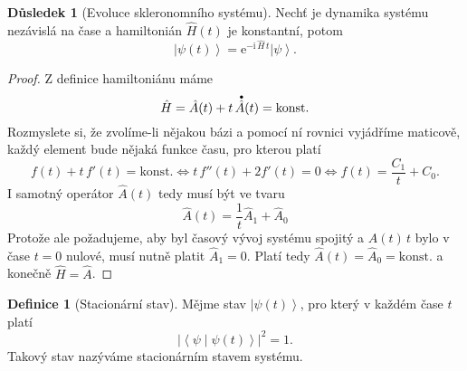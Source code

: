 \documentclass[10pt,a4paper]{article}
\theoremstyle{definition}
\newtheorem{definition}[theorem]{Definice}
\newtheorem{corollary}[theorem]{Důsledek}
\newcommand{\const}[1]{\mathrm{#1}}
\newcommand{\abs}[1]{\left| #1 \right|}
\newcommand{\ket}[1]{\left| #1 \right>}
\newcommand{\braket}[2]{\left< #1 \middle| #2 \right>}
\newcommand{\e}[1]{\const{e}^{#1}}
\renewcommand{\i}{\const{i}}
\newcommand{\bigdot}[1]{\accentset{\bullet}{#1}}
\def\konst{\mathrm{konst.}}
\begin{document}
\begin{corollary}[Evoluce skleronomního systému]
    \label{evoluce-skleronomniho-systemu}
    Nechť je dynamika systému nezávislá na čase a hamiltonián $\hat H(t)$ je konstantní, potom
    \begin{equation*}
        \ket{\psi(t)} = \e{-\i \, \hat{H} \, t} \ket{\psi}.
    \end{equation*}
\end{corollary}
\begin{proof}
    Z definice hamiltoniánu máme
    \begin{equation*}
        \hat H = \hat A(t) + t \, \bigdot{\hat A}(t) = \konst
    \end{equation*}
    Rozmyslete si, že zvolíme-li nějakou bázi a pomocí ní rovnici vyjádříme maticově, každý element bude nějaká funkce času, pro kterou platí
    \begin{equation*}
        f(t) + t \, f'(t) = \konst
        \iff
        t \, f''(t) + 2 f'(t) = 0
        \iff
        f(t) = \frac{C_1}{t} + C_0.
    \end{equation*}
    I samotný operátor $\hat A(t)$ tedy musí být ve tvaru
    \begin{equation*}
        \hat A(t) = \frac{1}{t} \hat A_1 + \hat A_0
    \end{equation*}
    Protože ale požadujeme, aby byl časový vývoj systému spojitý a $\hat A(t) \, t$ bylo v čase $t=0$ nulové, musí nutně platit $\hat A_1 = 0$. Platí tedy $\hat A(t) = \hat A_0 = \konst$ a konečně $\hat H = \hat A$.
\end{proof}

\begin{definition}[Stacionární stav]
    Mějme stav $\ket{\psi(t)}$, pro který v každém čase $t$ platí
    \begin{equation*}
        \abs{\braket{\psi}{\psi(t)}}^2 = 1.
    \end{equation*}
    Takový stav nazýváme stacionárním stavem systému.
\end{definition}
\end{document}
